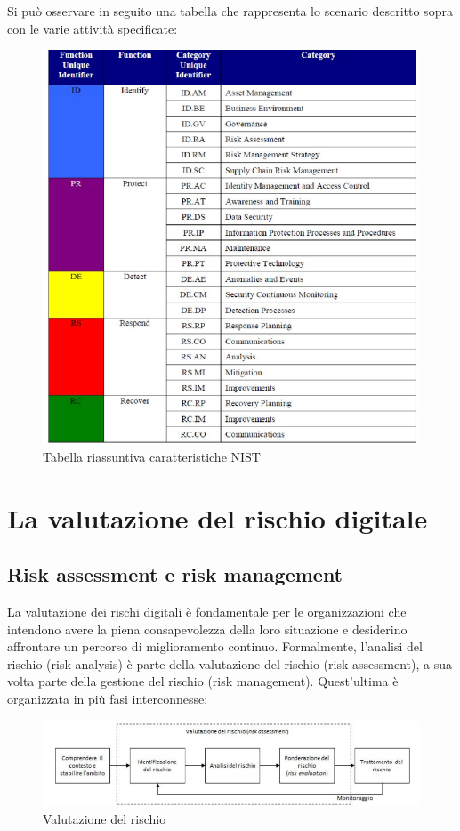 Si può osservare in seguito una tabella che rappresenta lo scenario descritto sopra con le varie attività specificate:

\begin{figure}[H]
    \centering
    \includegraphics[scale=0.8]{Immagini/img5.png}
    \caption{Tabella riassuntiva caratteristiche NIST}
    \label{fig:caratteristicheRiassuntiveNIST}
\end{figure}


\chapter{La valutazione del rischio digitale}
\section{Risk assessment e risk management }
La valutazione dei rischi digitali è fondamentale per le organizzazioni che intendono
avere la piena consapevolezza della loro situazione e desiderino affrontare un percorso
di miglioramento continuo. Formalmente, l’analisi del rischio (risk analysis) è parte della
valutazione del rischio (risk assessment), a sua volta parte della gestione del rischio
(risk management). Quest’ultima è organizzata in più fasi interconnesse: 
\begin{figure}[H]
    \centering
    \includegraphics[scale=0.9]{Immagini/img6.png}
    \caption{Valutazione del rischio}
    \label{fig:ValutazioneRischio}
\end{figure}

